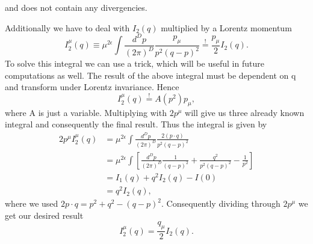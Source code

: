 	and does not contain any divergencies.
	\par
	Additionally we have to deal with $I_2(q)$ multiplied by a Lorentz momentum 
	\begin{equation}
		I^\mu_2(q) \equiv \mu^{2\epsilon} \int \frac{d^Dp}{(2\pi)^D} \frac{p_\mu}{p^2(q-p)^2} \overset{!}{=} \frac{p_\mu}{2} I_2(q).
	\end{equation}
	To solve this integral we can use a trick, which will be useful in future computations as well. The result of the above integral must be dependent on q and transform under Lorentz invariance. Hence 
	\begin{equation}
		I^\mu_2(q) \overset{!}{=} A(p^2) p_\mu,
	\end{equation}
	where A is just a variable. Multiplying with $2p^\mu$ will give us three already known integral and consequently the final result. Thus the integral is given by
	\begin{equation}
		\begin{split}
			2p^\mu I^\mu_2(q) &= \mu^{2\epsilon} \int \frac{d^Dp}{(2\pi)^D}\frac{2(p\cdot q)}{p^2(q-p)^2} \\
			&= \mu^{2\epsilon} \int [\frac{d^Dp}{(2\pi)^D} \frac{1}{(q-p)^2} + \frac{q^2}{p^2(q-p)^2} - \frac{1}{p^2}] \\
			&= I_1(q) + q^2I_2(q) - I(0) \\
			&= q^2 I_2(q),
		\end{split}
	\end{equation}
	where we used $2p\cdot q = p^2 + q^2 - (q-p)^2$. Consequently dividing through $2p^\mu$ we get our desired result
	\begin{equation}
		I^\mu_2(q) = \frac{q_\mu}{2} I_2(q).
	\end{equation}

